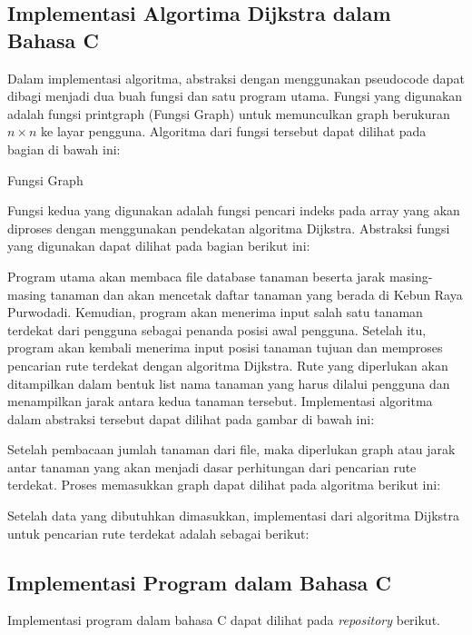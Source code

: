 \documentclass[conference]{IEEEtran}
\begin{document}
\subsection{Implementasi Algortima Dijkstra dalam Bahasa C}
Dalam implementasi algoritma, abstraksi dengan menggunakan pseudocode dapat dibagi menjadi dua buah fungsi dan
satu program utama. Fungsi yang digunakan adalah fungsi
printgraph (Fungsi Graph) untuk memunculkan graph berukuran \(n \times  n\) ke layar pengguna. Algoritma dari fungsi tersebut
dapat dilihat pada bagian di bawah ini:

\begin{algorithm}[hbt!]
    \caption{Fungsi Graph}
\end{algorithm}

Fungsi kedua yang digunakan adalah fungsi pencari indeks
pada array yang akan diproses dengan menggunakan pendekatan algoritma Dijkstra. Abstraksi fungsi yang digunakan
dapat dilihat pada bagian berikut ini:

Program utama akan membaca file database tanaman
beserta jarak masing-masing tanaman dan akan mencetak
daftar tanaman yang berada di Kebun Raya Purwodadi.
Kemudian, program akan menerima input salah satu tanaman
terdekat dari pengguna sebagai penanda posisi awal pengguna.
Setelah itu, program akan kembali menerima input posisi
tanaman tujuan dan memproses pencarian rute terdekat dengan
algoritma Dijkstra. Rute yang diperlukan akan ditampilkan
dalam bentuk list nama tanaman yang harus dilalui pengguna
dan menampilkan jarak antara kedua tanaman tersebut.
Implementasi algoritma dalam abstraksi tersebut dapat dilihat
pada gambar di bawah ini:

Setelah pembacaan jumlah tanaman dari file, maka diperlukan graph atau jarak antar tanaman yang akan menjadi dasar
perhitungan dari pencarian rute terdekat. Proses memasukkan
graph dapat dilihat pada algoritma berikut ini:

Setelah data yang dibutuhkan dimasukkan, implementasi
dari algoritma Dijkstra untuk pencarian rute terdekat adalah
sebagai berikut:

\subsection{Implementasi Program dalam Bahasa C}
Implementasi program dalam bahasa C dapat dilihat
pada \emph{repository} berikut.
\end{document}
